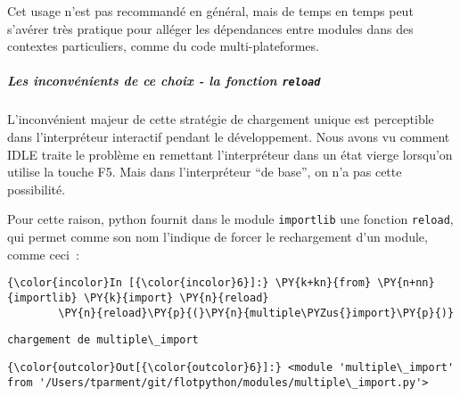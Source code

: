 \begin{Shaded}
\begin{Highlighting}[frame=lines,framerule=0.6mm,rulecolor=\color{asisframecolor}]
\end{Highlighting}
\end{Shaded}

Cet usage n'est pas recommandé en général, mais de temps en temps peut
s'avérer très pratique pour alléger les dépendances entre modules dans
des contextes particuliers, comme du code multi-plateformes.

    \hypertarget{les-inconvuxe9nients-de-ce-choix---la-fonction-reload}{%
\subparagraph{\texorpdfstring{Les inconvénients de ce choix - la
fonction
\texttt{reload}}{Les inconvénients de ce choix - la fonction reload}}\label{les-inconvuxe9nients-de-ce-choix---la-fonction-reload}}

    L'inconvénient majeur de cette stratégie de chargement unique est
perceptible dans l'interpréteur interactif pendant le développement.
Nous avons vu comment IDLE traite le problème en remettant
l'interpréteur dans un état vierge lorsqu'on utilise la touche F5. Mais
dans l'interpréteur ``de base'', on n'a pas cette possibilité.

    Pour cette raison, python fournit dans le module \texttt{importlib} une
fonction \texttt{reload}, qui permet comme son nom l'indique de forcer
le rechargement d'un module, comme ceci~:

    \begin{Verbatim}[commandchars=\\\{\},frame=single,framerule=0.3mm,rulecolor=\color{cellframecolor}]
{\color{incolor}In [{\color{incolor}6}]:} \PY{k+kn}{from} \PY{n+nn}{importlib} \PY{k}{import} \PY{n}{reload}
        \PY{n}{reload}\PY{p}{(}\PY{n}{multiple\PYZus{}import}\PY{p}{)}
\end{Verbatim}


    \begin{Verbatim}[commandchars=\\\{\},frame=single,framerule=0.3mm,rulecolor=\color{cellframecolor}]
chargement de multiple\_import
\end{Verbatim}

\begin{Verbatim}[commandchars=\\\{\},frame=single,framerule=0.3mm,rulecolor=\color{cellframecolor}]
{\color{outcolor}Out[{\color{outcolor}6}]:} <module 'multiple\_import' from '/Users/tparment/git/flotpython/modules/multiple\_import.py'>
\end{Verbatim}
            
